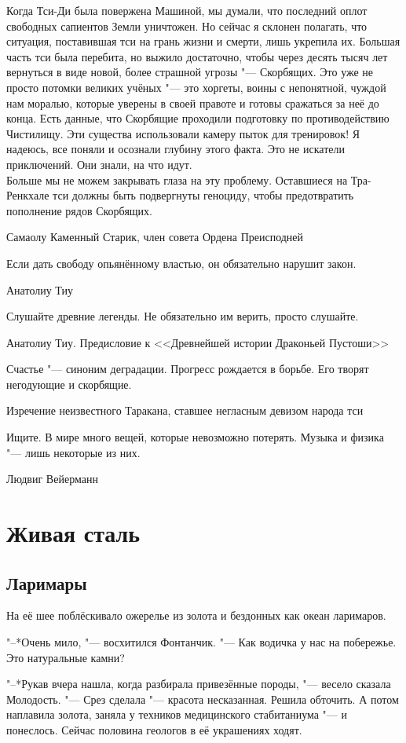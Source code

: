 \epigraph
{Когда Тси-Ди была повержена Машиной, мы думали, что последний оплот свободных сапиентов Земли уничтожен.
Но сейчас я склонен полагать, что ситуация, поставившая тси на грань жизни и смерти, лишь укрепила их.
Большая часть тси была перебита, но выжило достаточно, чтобы через десять тысяч лет вернуться в виде новой, более страшной угрозы "--- Скорбящих.
Это уже не просто потомки великих учёных "--- это хоргеты, воины с непонятной, чуждой нам моралью, которые уверены в своей правоте и готовы сражаться за неё до конца.
Есть данные, что Скорбящие проходили подготовку по противодействию Чистилищу.
Эти существа использовали камеру пыток для тренировок!
Я надеюсь, все поняли и осознали глубину этого факта.
Это не искатели приключений.
Они знали, на что идут.\\
Больше мы не можем закрывать глаза на эту проблему.
Оставшиеся на Тра-Ренкхале тси должны быть подвергнуты геноциду, чтобы предотвратить пополнение рядов Скорбящих.}
{Самаолу Каменный Старик, член совета Ордена Преисподней}

\epigraph
{Если дать свободу опьянённому властью, он обязательно нарушит закон.}
{Анатолиу Тиу}

\epigraph
{Слушайте древние легенды.
Не обязательно им верить, просто слушайте.}
{Анатолиу Тиу.
Предисловие к <<Древнейшей истории Драконьей Пустоши>>}

\epigraph{Счастье "--- синоним деградации.
Прогресс рождается в борьбе.
Его творят негодующие и скорбящие.}
{Изречение неизвестного Таракана, ставшее негласным девизом народа тси}

\epigraph{Ищите.
В мире много вещей, которые невозможно потерять.
Музыка и физика "--- лишь некоторые из них.}
{Людвиг Вейерманн}

\chapter{Живая сталь}

\section{Ларимары}

На её шее поблёскивало ожерелье из золота и бездонных как океан ларимаров.

"--*Очень мило, "--- восхитился Фонтанчик.
"--- Как водичка у нас на побережье.
Это натуральные камни?

"--*Рукав вчера нашла, когда разбирала привезённые породы, "--- весело сказала Молодость.
"--- Срез сделала "--- красота несказанная.
Решила обточить.
А потом наплавила золота, заняла у техников медицинского стабитаниума "--- и понеслось.
Сейчас половина геологов в её украшениях ходят.


